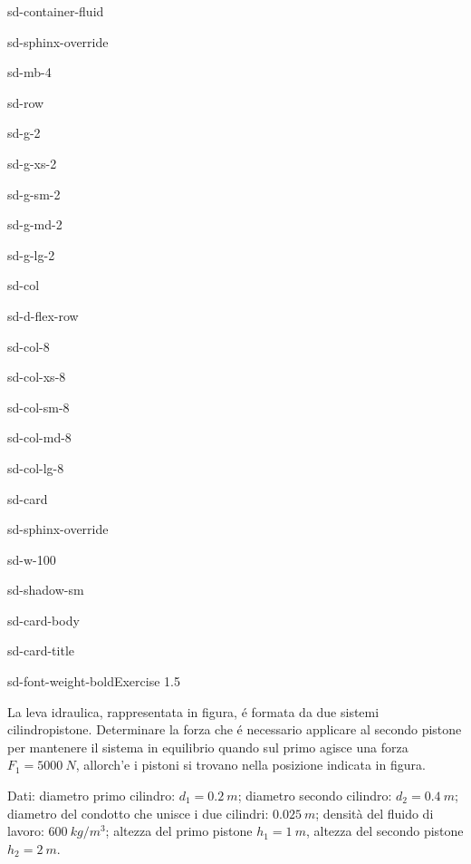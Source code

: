 \documentclass[letterpaper,10pt,italian]{jupyterBook}
\begin{document}
\begin{sphinxuseclass}{sd-container-fluid}
\begin{sphinxuseclass}{sd-sphinx-override}
\begin{sphinxuseclass}{sd-mb-4}
\begin{sphinxuseclass}{sd-row}
\begin{sphinxuseclass}{sd-g-2}
\begin{sphinxuseclass}{sd-g-xs-2}
\begin{sphinxuseclass}{sd-g-sm-2}
\begin{sphinxuseclass}{sd-g-md-2}
\begin{sphinxuseclass}{sd-g-lg-2}
\begin{sphinxuseclass}{sd-col}
\begin{sphinxuseclass}{sd-d-flex-row}
\begin{sphinxuseclass}{sd-col-8}
\begin{sphinxuseclass}{sd-col-xs-8}
\begin{sphinxuseclass}{sd-col-sm-8}
\begin{sphinxuseclass}{sd-col-md-8}
\begin{sphinxuseclass}{sd-col-lg-8}
\begin{sphinxuseclass}{sd-card}
\begin{sphinxuseclass}{sd-sphinx-override}
\begin{sphinxuseclass}{sd-w-100}
\begin{sphinxuseclass}{sd-shadow-sm}
\begin{sphinxuseclass}{sd-card-body}
\begin{sphinxuseclass}{sd-card-title}
\begin{sphinxuseclass}{sd-font-weight-bold}Exercise 1.5
\end{sphinxuseclass}
\end{sphinxuseclass}
\sphinxAtStartPar
La leva idraulica, rappresentata in figura, é formata da due
sistemi cilindro\sphinxhyphen{}pistone.
Determinare la forza che é necessario applicare al secondo pistone
per mantenere il sistema in equilibrio
quando sul primo agisce una forza \(F_1 = 5000\ N\),
allorch’e i pistoni si trovano nella posizione indicata in figura.

\sphinxAtStartPar
Dati: diametro primo cilindro: \(d_1 = 0.2\ m\); diametro secondo cilindro:
\(d_2 = 0.4\ m\); diametro del condotto che unisce i due cilindri:
\(0.025\ m\);
densità del fluido di lavoro: \(600\ kg/m^3\);
altezza del primo pistone \(h_1 = 1\ m\), altezza del secondo pistone
\(h_2=2\ m\).


\end{sphinxuseclass}
\end{sphinxuseclass}
\end{sphinxuseclass}
\end{sphinxuseclass}
\end{sphinxuseclass}
\end{sphinxuseclass}
\end{sphinxuseclass}
\end{sphinxuseclass}
\end{sphinxuseclass}
\end{sphinxuseclass}
\end{sphinxuseclass}
\end{sphinxuseclass}
\end{sphinxuseclass}
\end{sphinxuseclass}
\end{sphinxuseclass}
\end{sphinxuseclass}
\end{sphinxuseclass}
\end{sphinxuseclass}
\end{sphinxuseclass}
\end{sphinxuseclass}
\end{sphinxuseclass}
\end{document}
